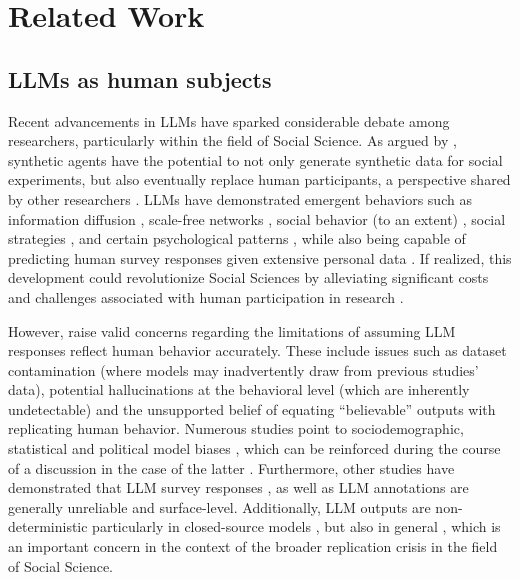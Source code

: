 %
\section{Related Work}

\subsection{LLMs as human subjects}
\label{ssec:related:human-llm}

Recent advancements in \acp{LLM} have sparked considerable debate among researchers, particularly within the field of Social Science. As argued by \citet{grossman_2023}, synthetic agents have the potential to not only generate synthetic data for social experiments, but also eventually replace human participants, a perspective shared by other researchers \cite{tornberg_2023, argyle2023}. \acp{LLM} have demonstrated emergent behaviors such as information diffusion \cite{Park2023GenerativeAI}, scale-free networks \cite{demarzo_2023}, social behavior (to an extent) \cite{leng_2024}, social strategies \cite{abdelnabi_negotiations}, and certain psychological patterns \cite{abramski_2023}, while also being capable of predicting human survey responses given extensive personal data \cite{park2024generativeagentsimulations1000}. If realized, this development could revolutionize Social Sciences by alleviating significant costs and challenges associated with human participation in research \cite{rossi_2024, shapiro2019polling}.

However, \citet{rossi_2024} raise valid concerns regarding the limitations of assuming \ac{LLM} responses reflect human behavior accurately. These include issues such as dataset contamination (where models may inadvertently draw from previous studies' data), potential hallucinations at the behavioral level (which are inherently undetectable) and the unsupported belief of equating “believable” outputs with replicating human behavior. Numerous studies point to sociodemographic, statistical and political model biases \cite{anthis_2025, hewitt2024predicting, rossi_2024}, which can be reinforced during the course of a discussion in the case of the latter \cite{Taubenfeld2024SystematicBI}. Furthermore, other studies have demonstrated that \ac{LLM} survey responses \cite{jansen_2023, bisbee_2023, neumann_2025}, as well as \ac{LLM} annotations \cite{Gligoric2024CanUL} are generally unreliable and surface-level. Additionally, \ac{LLM} outputs are non-deterministic particularly in closed-source models \cite{bisbee_2023}, but also in general \cite{atil_2025}, which is an important concern in the context of the broader replication crisis in the field of Social Science.

